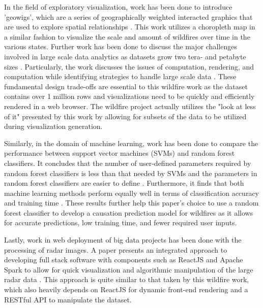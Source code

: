 \documentclass[conference]{IEEEtran}
\begin{document}
In the field of exploratory visualization, work has been done to introduce 'geowigs', which are a series of geographically weighted interacted graphics that are used to explore spatial relationships \cite{4376135}. This work utilizes a choropleth map in a similar fashion to visualize the scale and amount of wildfires over time in the various states. Further work has been done to discuss the major challenges involved in large scale data analytics as datasets grow two tera- and petabyte sizes \cite{Fisher:2016:BDE:2939502.2939518}. Particularly, the work discusses the issues of computation, rendering, and computation while identifying strategies to handle large scale data \cite{Fisher:2016:BDE:2939502.2939518}. These fundamental design trade-offs are essential to this wildfire work as the dataset contains over 1 million rows and visualizations need to be quickly and efficiently rendered in a web browser. The wildfire project actually utilizes the "look at less of it" presented by this work by allowing for subsets of the data to be utilized during visualization generation. \par

Similarly, in the domain of machine learning, work has been done to compare the performance between support vector machines (SVMs) and random forest classifiers. It concludes that the number of user-defined parameters required by random forest classifiers is less than that needed by SVMs and the parameters in random forest classifiers are easier to define \cite{random_forest_related}. Furthermore, it finds that both machine learning methods perform equally well in terms of classification accuracy and training time \cite{random_forest_related}. These results further help this paper's choice to use a random forest classifier to develop a causation prediction model for wildfires as it allows for accurate predictions, low training time, and fewer required user inputs. \par

Lastly, work in web deployment of big data projects has been done with the processing of radar images. A paper presents an integrated approach to developing full stack software with components such as ReactJS and Apache Spark to allow for quick visualization and algorithmic manipulation of the large radar data \cite{potapovinformation}. This approach is quite similar to that taken by this wildfire work, which also heavily depends on ReactJS for dynamic front-end rendering and a RESTful API to manipulate the dataset. \par
\end{document}
